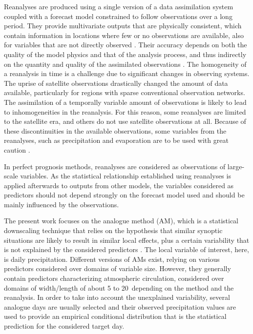 \documentclass{ametsoc}
\begin{document}
	Reanalyses are produced using a single version of a data assimilation system coupled with a forecast model constrained to follow observations over a long period. They provide multivariate outputs that are physically consistent, which contain information in locations where few or no observations are available, also for variables that are not directly observed \citep{Gelaro2017}. Their accuracy depends on both the quality of the model physics and that of the analysis process, and thus indirectly on the quantity and quality of the assimilated observations \citep{Dee2011a}. The homogeneity of a reanalysis in time is a challenge due to significant changes in observing systems. The uprise of satellite observations drastically changed the amount of data available, particularly for regions with sparse conventional observation networks. The assimilation of a temporally variable amount of observations is likely to lead to inhomogeneities in the reanalysis. For this reason, some reanalyses are limited to the satellite era, and others do not use satellite observations at all. Because of these discontinuities in the available observations, some variables from the reanalyses, such as precipitation and evaporation are to be used with great caution \citep{Kobayashi2015}.
	
	In perfect prognosis methods, reanalyses are considered as observations of large-scale variables. As the statistical relationship established using reanalyses is applied afterwards to outputs from other models, the variables considered as predictors should not depend strongly on the forecast model used and should be mainly influenced by the observations.
	
	The present work focuses on the analogue method (AM), which is a statistical downscaling technique that relies on the hypothesis that similar synoptic situations are likely to result in similar local effects, plus a certain variability that is not explained by the considered predictors \citep{Lorenz1969}. The local variable of interest, here, is daily precipitation.  Different versions of AMs exist, relying on various predictors considered over domains of variable size. However, they generally contain predictors characterizing atmospheric circulation, considered over domains of width/length of about 5 to 20\degree\ depending on the method and the reanalysis. In order to take into account the unexplained variability, several analogue days are usually selected and their observed precipitation values are used to provide an empirical conditional distribution that is the statistical prediction for the considered target day.
	
\end{document}
